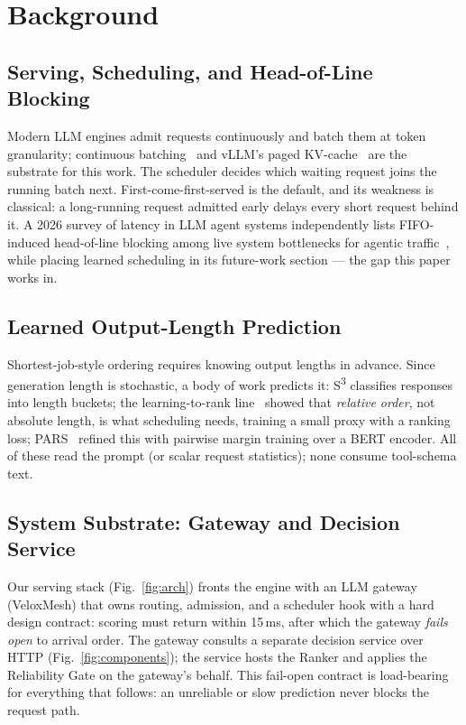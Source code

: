\section{Background}

\subsection{Serving, Scheduling, and Head-of-Line Blocking}
Modern LLM engines admit requests continuously and batch them at
token granularity; continuous batching~\cite{orca2022} and vLLM's paged
KV-cache~\cite{vllm2023} are the substrate for this work. The scheduler decides which waiting request joins
the running batch next. First-come-first-served is the default, and its
weakness is classical: a long-running request admitted early delays every
short request behind it. A 2026 survey of latency in LLM agent systems
independently lists FIFO-induced head-of-line blocking among live system
bottlenecks for agentic traffic~\cite{park2026minimizing}, while placing
learned scheduling in its future-work section --- the gap this paper works in.

\subsection{Learned Output-Length Prediction}
Shortest-job-style ordering requires knowing output lengths in
advance. Since generation length is stochastic, a body of work predicts it:
S\textsuperscript{3} classifies responses into length buckets; the
learning-to-rank line~\cite{fuLTR2024} showed that \emph{relative order},
not absolute length, is what scheduling needs, training a small proxy with a
ranking loss; PARS~\cite{tao2026ranking} refined this with pairwise margin
training over a BERT encoder. All of these read the prompt (or scalar request
statistics); none consume tool-schema text.

\subsection{System Substrate: Gateway and Decision Service}
Our serving stack (Fig.~\ref{fig:arch}) fronts the engine with an
LLM gateway (VeloxMesh) that owns routing, admission, and a scheduler hook
with a hard design contract: scoring must return within 15\,ms, after which
the gateway \emph{fails open} to arrival order. The gateway consults a
separate decision service over HTTP (Fig.~\ref{fig:components}); the service
hosts the Ranker and applies the Reliability Gate on the gateway's behalf.
This fail-open contract is load-bearing for everything that follows: an
unreliable or slow prediction never blocks the request path.

